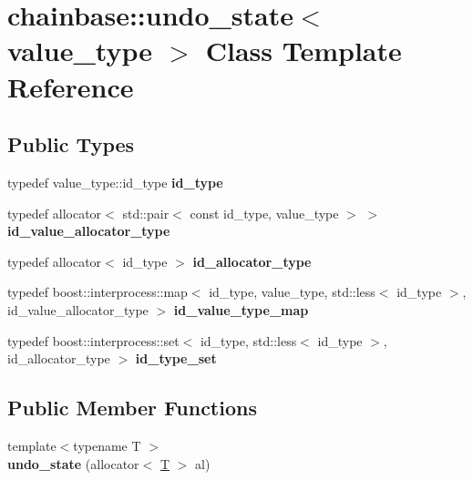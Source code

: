 \hypertarget{classchainbase_1_1undo__state}{}\section{chainbase\+:\+:undo\+\_\+state$<$ value\+\_\+type $>$ Class Template Reference}
\label{classchainbase_1_1undo__state}
\subsection*{Public Types}
\begin{DoxyCompactItemize}
\item 
\mbox{\label{classchainbase_1_1undo__state_acf7017fc33b7f6c6067efeb226f872ad}} 
typedef value\+\_\+type\+::id\+\_\+type {\bfseries id\+\_\+type}
\item 
\mbox{\label{classchainbase_1_1undo__state_a5538908b3c2c5cce7073aa565a136d50}} 
typedef allocator$<$ std\+::pair$<$ const id\+\_\+type, value\+\_\+type $>$ $>$ {\bfseries id\+\_\+value\+\_\+allocator\+\_\+type}
\item 
\mbox{\label{classchainbase_1_1undo__state_ac3b3c0a3b1d2379c519b942f13926d53}} 
typedef allocator$<$ id\+\_\+type $>$ {\bfseries id\+\_\+allocator\+\_\+type}
\item 
\mbox{\label{classchainbase_1_1undo__state_a8234f3c70dc5fc0eaae7b133473f351c}} 
typedef boost\+::interprocess\+::map$<$ id\+\_\+type, value\+\_\+type, std\+::less$<$ id\+\_\+type $>$, id\+\_\+value\+\_\+allocator\+\_\+type $>$ {\bfseries id\+\_\+value\+\_\+type\+\_\+map}
\item 
\mbox{\label{classchainbase_1_1undo__state_a776184d6ec14ab0876af518441456c4d}} 
typedef boost\+::interprocess\+::set$<$ id\+\_\+type, std\+::less$<$ id\+\_\+type $>$, id\+\_\+allocator\+\_\+type $>$ {\bfseries id\+\_\+type\+\_\+set}
\end{DoxyCompactItemize}
\subsection*{Public Member Functions}
\begin{DoxyCompactItemize}
\item 
\mbox{\label{classchainbase_1_1undo__state_ac2ff105e7b9261bd691b7367ce0bb302}} 
{\footnotesize template$<$typename T $>$ }\\{\bfseries undo\+\_\+state} (allocator$<$ \mbox{\hyperlink{struct_t}{T}} $>$ al)
\end{DoxyCompactItemize}
